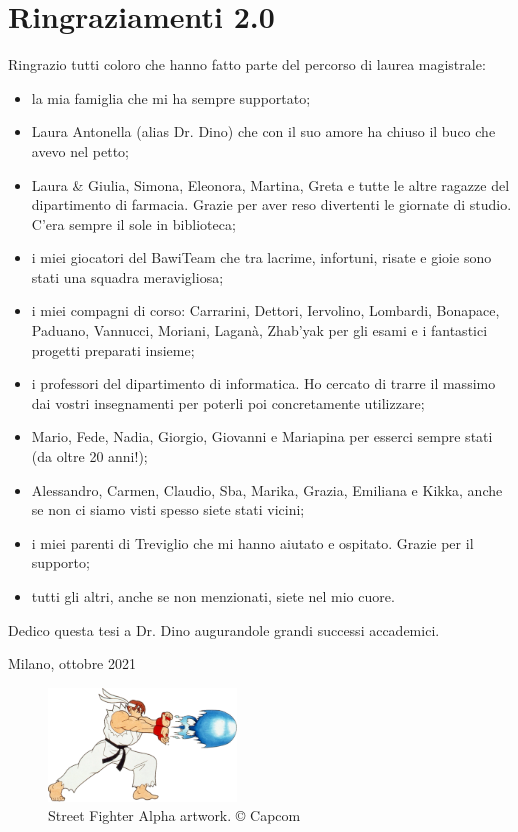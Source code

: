 %
%
\chapter*{Ringraziamenti 2.0}

Ringrazio tutti coloro che hanno fatto parte del percorso di laurea magistrale:
\begin{itemize}
	\item la mia famiglia che mi ha sempre supportato;
	\item Laura Antonella (alias Dr. Dino) che con il suo amore ha chiuso il buco che avevo nel petto;
	\item Laura \& Giulia, Simona, Eleonora, Martina, Greta e tutte le altre ragazze del dipartimento di farmacia. Grazie per aver reso divertenti le giornate di studio. C'era sempre il sole in biblioteca;
	\item i miei giocatori del BawiTeam che tra lacrime, infortuni, risate e gioie sono stati una squadra meravigliosa;
	\item i miei compagni di corso: Carrarini, Dettori, Iervolino, Lombardi, Bonapace, Paduano, Vannucci, Moriani, Laganà, Zhab'yak per gli esami e i fantastici progetti preparati insieme;
	\item i professori del dipartimento di informatica. Ho cercato di trarre il massimo dai vostri insegnamenti per poterli poi concretamente utilizzare;
	\item Mario, Fede, Nadia, Giorgio, Giovanni e Mariapina per esserci sempre stati (da oltre 20 anni!);
	\item Alessandro, Carmen, Claudio, Sba, Marika, Grazia, Emiliana e Kikka, anche se non ci siamo visti spesso siete stati vicini;	
	\item i miei parenti di Treviglio che mi hanno aiutato e ospitato. Grazie per il supporto;
	\item tutti gli altri, anche se non menzionati, siete nel mio cuore.
\end{itemize}

Dedico questa tesi a Dr. Dino augurandole grandi successi accademici.

\begin{flushright}
	Milano, ottobre 2021
\end{flushright}

\vspace*{\fill}

\begin{figure}[H]
	\centering
	\includegraphics[width=5cm]{immagini/hadoken}
	\caption{Street Fighter Alpha artwork. © Capcom}
	\label{fig:hadoken}
\end{figure}